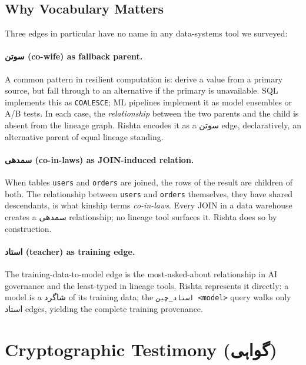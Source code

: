 \documentclass[10pt,twocolumn]{article}
\newcommand{\ur}[1]{{\urdufont #1}}
\begin{document}
\subsection{Why Vocabulary Matters}

Three edges in particular have no name in any data-systems tool we surveyed:

\paragraph{\ur{سوتن} (co-wife) as fallback parent.}
A common pattern in resilient computation is: derive a value from a primary source, but fall through to an alternative if the primary is unavailable. SQL implements this as \texttt{COALESCE}; ML pipelines implement it as model ensembles or A/B tests. In each case, the \emph{relationship} between the two parents and the child is absent from the lineage graph. Rishta encodes it as a \ur{سوتن} edge, declaratively, an alternative parent of equal lineage standing.

\paragraph{\ur{سمدھی} (co-in-laws) as JOIN-induced relation.}
When tables \texttt{users} and \texttt{orders} are joined, the rows of the result are children of both. The relationship between \texttt{users} and \texttt{orders} themselves, they have shared descendants, is what kinship terms \emph{co-in-laws}. Every JOIN in a data warehouse creates a \ur{سمدھی} relationship; no lineage tool surfaces it. Rishta does so by construction.

\paragraph{\ur{استاد} (teacher) as training edge.}
The training-data-to-model edge is the most-asked-about relationship in AI governance and the least-typed in lineage tools. Rishta represents it directly: a model is a \ur{شاگرد} of its training data; the \texttt{\ur{استاد\_چین} <model>} query walks only \ur{استاد} edges, yielding the complete training provenance.

\section{Cryptographic Testimony (\ur{گواہی})}
\label{sec:crypto}
\end{document}
